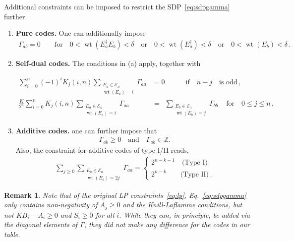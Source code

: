 \documentclass[12pt,a4paper]{amsart}
\DeclareMathOperator{\wt}{wt}
\newtheorem{remark}[theorem]{Remark}
\newcommand{\E}{\mathcal{E}}
\newcommand{\nn}{\nonumber}
\begin{document}
Additional constraints can be imposed to restrict the SDP~\eqref{eq:sdpgamma}  further.
% 
\begin{enumerate}  [label=(\alph*)]
\item {\bf Pure codes.} 
One can additionally impose
% 
\begin{align}\label{eq:selfdual}
\Gamma_{ab}=0
	\quad\quad 
	\text{for} \quad 0 < \wt(E^\dagger_a E_b)<\delta \quad \text{or} \quad 0 < \wt(E^\dagger_a)<\delta \quad \text{or} \quad  0 < \wt(E_b)<\delta\,.
\end{align}
% 
\item {\bf Self-dual codes.} The conditions in (a) apply, together with

\begin{align}\label{eq:addLP_matrix}
 \sum^n_{i=0} (-1)^i K_j(i,n) \!\!\sum_{\substack{E_{a} \in \E_n \\ \wt(E_a)=i}} \Gamma_{aa} &=0 \quad\quad \quad  \text{if} \quad  n-j \quad \text{is odd}\,, \nn\\
\frac{K}{2^n}\sum^n_{i=0} K_j(i,n) \!\!\sum_{\substack{E_{a} \in \E_n \\ \wt(E_a)=i}} \Gamma_{aa}
	\,\,\, &= \,\,\,
	\sum_{\substack{E_b \in \E_n \\ \wt(E_b)=j}} \Gamma_{bb}  \quad \,\text{for} \quad 0\leq j \leq n \,,
\end{align}

\item {\bf Additive codes.} one can further impose that
% 
\begin{align}
\Gamma_{ab}\geq 0 \quad \text{and}  \quad \Gamma_{ab}\in \mathbb{Z}.
\end{align}
%
Also, the constraint for additive codes of type I/II reads,
\begin{align}\label{eq:gamma_add_type}
	\sum_{j\geq 0} \sum_{\substack{E_{a} \in \E_n \\ \wt(E_a)=2j}} \Gamma_{aa}
	=\begin{cases}
2^{n-k-1} \quad \text{(Type I)} \\  2^{n-k} \quad \quad \!\text{(Type II)}\,.
	\end{cases}
\end{align}

\end{enumerate}

 
\begin{remark}
Note that of the original LP constraints~\eqref{eq:lp},
Eq.~\eqref{eq:sdpgamma} 
only contains non-negativity of $A_j \geq 0$ and the Knill-Laflamme conditions,
but not
$KB_i-A_i\geq 0$ and $S_i\geq 0$ for all $i$.
While they can, in principle, be added via the diagonal elements of $\Gamma$, they did not make any difference for the codes in our table.
\end{remark}
 
\end{document}
